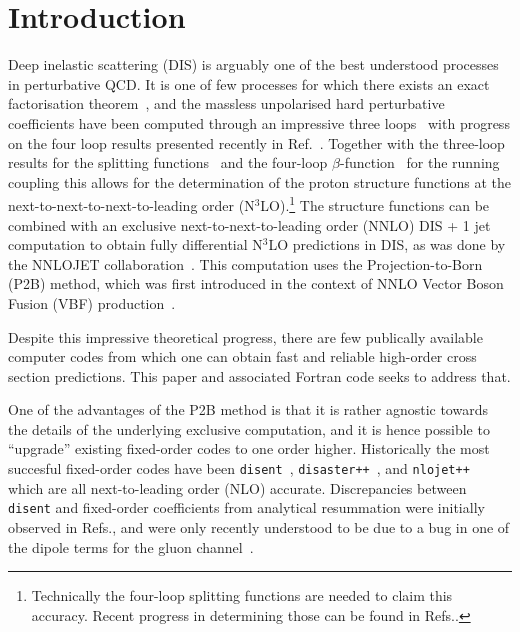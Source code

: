 \documentclass[submission, PhysCodeb]{SciPost}
\newcommand{\disent}{{\tt disent}}
\newcommand{\disaster}{{\tt disaster++}}
\newcommand{\nlojet}{{\tt nlojet++}}
\newcommand{\NNNLO}{N$^3$LO}
\begin{document}
\section{Introduction}
\label{sec:intro}
Deep inelastic scattering (DIS) is arguably one of the best understood
processes in perturbative QCD. It is one of few processes for which
there exists an exact factorisation
theorem~\cite{Collins:1987pm,Collins:1989gx}, and the massless
unpolarised hard perturbative coefficients have been computed through
an impressive three
loops~\cite{SanchezGuillen:1990iq,vanNeerven:1991nn,Zijlstra:1992qd,Zijlstra:1992kj,vanNeerven:1999ca,vanNeerven:2000uj,Moch:1999eb,Moch:2004xu,Vermaseren:2005qc,Vogt:2006bt,Moch:2007rq,Davies:2016ruz}
with progress on the four loop results presented recently in
Ref.~\cite{Moch:2022frw}. Together with the three-loop results for the
splitting functions~\cite{Moch:2004pa,Vogt:2004mw} and the four-loop
$\beta$-function~\cite{vanRitbergen:1997va,Czakon:2004bu} for the
running coupling this allows for the determination of the proton
structure functions at the next-to-next-to-next-to-leading order
(\NNNLO{}).\footnote{Technically the four-loop splitting functions are
needed to claim this accuracy. Recent progress in determining those
can be found in
Refs.\cite{Moch:2021qrk,Falcioni:2023luc,Falcioni:2023vqq,Gehrmann:2023cqm}.}
The structure functions can be combined with an exclusive
next-to-next-to-leading order (NNLO) DIS + 1 jet computation to obtain
fully differential \NNNLO{} predictions in DIS, as was done by the NNLOJET
collaboration~\cite{Currie:2018fgr,Gehrmann:2018odt}. This computation
uses the Projection-to-Born (P2B) method, which was first introduced
in the context of NNLO Vector Boson Fusion (VBF)
production~\cite{Cacciari:2015jma}.

Despite this impressive theoretical progress, there are few publically
available computer codes from which one can obtain
fast and reliable high-order cross section predictions. This paper
and associated Fortran code seeks to address that.

One of the advantages of the P2B method is that it is rather agnostic
towards the details of the underlying exclusive computation, and it is
hence possible to ``upgrade'' existing fixed-order codes to one order
higher. Historically the most succesful fixed-order codes have been
\disent{}~\cite{Catani:1996vz}, \disaster{}~\cite{Graudenz:1997gv},
and \nlojet{}~\cite{Nagy:2001xb} which are all next-to-leading order
(NLO) accurate. Discrepancies between \disent{} and fixed-order
coefficients from analytical resummation were initially observed in
Refs.\cite{Antonelli:1999kx,Dasgupta:2002dc}, and were only recently
understood to be due to a bug in one of the dipole terms for the gluon
channel~\cite{Borsa:2020ulb,Borsa:2020yxh}.
\end{document}
